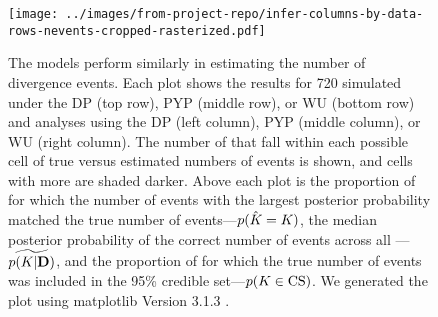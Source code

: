 \begin{figure}[htbp]
    \begin{center}
        \texttt{[image: ../images/from-project-repo/infer-columns-by-data-rows-nevents-cropped-rasterized.pdf]}
        \captionsetup{name=Figure S, labelformat=noSpace, listformat=sFigList}
        \caption{
        The models perform similarly in estimating the number of divergence
        events.
        Each plot shows the results for 720 \datasets
        simulated under the
        DP (top row),
        PYP (middle row),
        or
        WU (bottom row)
        and analyses using the
        DP (left column),
        PYP (middle column),
        or
        WU (right column).
        The number of \datasets that fall within each possible cell of true
        versus estimated numbers of events is shown, and cells with more
        \datasets are shaded darker.
        Above each plot is
        the proportion of \datasets for which the number of events with the largest
        posterior probability matched the true number of events---$p(\hat{K_{}}
        = K_{})$,
        the median posterior probability of the correct number of events across all
        \datasets---$\widetilde{p(K_{}|\mathbf{D})}$, and
        the proportion of \datasets for which the true number of events was
        included in the 95\% credible set---$p(K_{} \in
        \textrm{CS})$.
        We generated the plot using matplotlib Version 3.1.3
        \citep{matplotlib}.
        }
        \label{fig:neventsgrid}
    \end{center}
\end{figure}

